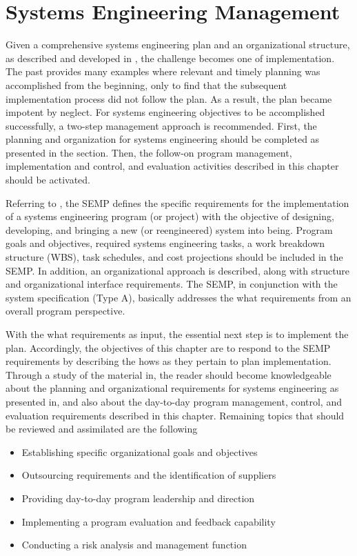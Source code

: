 \section{Systems Engineering Management}

Given a comprehensive systems engineering plan and an organizational structure, as described and developed in , the challenge becomes one of implementation. The past provides many examples where relevant and timely planning was accomplished from the beginning, only to find that the subsequent implementation process did not follow the plan. As a result, the plan became impotent by neglect. For systems engineering objectives to be accomplished successfully, a two-step management approach is recommended. First, the planning and organization for systems engineering should be completed as presented in the section. Then, the follow-on program management, implementation and control, and evaluation activities described in this chapter should be activated.

Referring to , the SEMP defines the specific requirements for the implementation of a systems engineering program (or project) with the objective of designing, developing, and bringing a new (or reengineered) system into being. Program goals and objectives, required systems engineering tasks, a work breakdown structure (WBS), task schedules, and cost projections should be included in the SEMP. In addition, an organizational approach is described, along with structure and organizational interface requirements. The SEMP, in conjunction with the system specification (Type A), basically addresses the what requirements from an overall program perspective.

With the what requirements as input, the essential next step is to implement the plan. Accordingly, the objectives of this chapter are to respond to the SEMP requirements by describing the hows as they pertain to plan implementation. Through a study of the material in, the reader should become knowledgeable about the planning and organizational requirements for systems engineering as presented in, and also about the day-to-day program management, control, and evaluation requirements described in this chapter. Remaining topics that should be reviewed and assimilated are the following

\begin{itemize}
\item Establishing specific organizational goals and objectives
\item Outsourcing requirements and the identification of suppliers
\item Providing day-to-day program leadership and direction
\item Implementing a program evaluation and feedback capability
\item Conducting a risk analysis and management function
\end{itemize}

